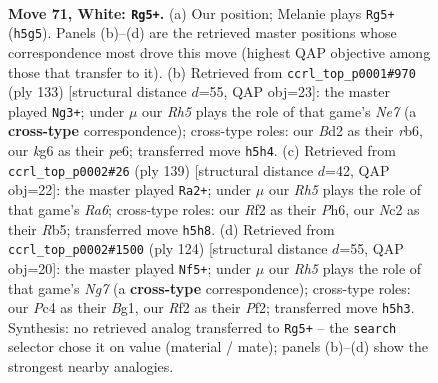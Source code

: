 \documentclass[11pt]{article}
\begin{document}
\clearpage

\begin{figure}[p]\centering
\begin{subfigure}{0.46\textwidth}\centering
\resizebox{\linewidth}{!}{%
\newchessgame
\chessboard[
  setfen={1rr5/pn6/1p2p1k1/4P2R/2P5/K5P1/P1NB1R2/8 w - - 1 71},
  showmover=false,
  pgfstyle=straightmove, color=movearrow, markmove={h5-g5}
]}
\caption{}
\end{subfigure}\hfill
\begin{subfigure}{0.46\textwidth}\centering
\resizebox{\linewidth}{!}{%
\newchessgame
\chessboard[
  setfen={6k1/3r2p1/1R1PPp2/p7/P6p/7P/2r1n3/3R1K2 b - - 8 67},
  showmover=false,
  pgfstyle=straightmove, color=movearrow, markmove={e2-g3}
]}
\caption{}
\end{subfigure}
\\[4pt]
\begin{subfigure}{0.46\textwidth}\centering
\resizebox{\linewidth}{!}{%
\newchessgame
\chessboard[
  setfen={2R5/2R2p1k/5P1p/1r1pp1p1/1P4P1/r6P/3K4/8 b - - 14 70},
  showmover=false,
  pgfstyle=straightmove, color=movearrow, markmove={a3-a2}
]}
\caption{}
\end{subfigure}\hfill
\begin{subfigure}{0.46\textwidth}\centering
\resizebox{\linewidth}{!}{%
\newchessgame
\chessboard[
  setfen={8/1R4N1/2p4k/3n3P/2p3p1/5pP1/5P2/2r3BK w - - 5 63},
  showmover=false,
  pgfstyle=straightmove, color=movearrow, markmove={g7-f5}
]}
\caption{}
\end{subfigure}
\caption{\textbf{Move 71, White: \texttt{Rg5+}.} (a) Our position; Melanie plays \texttt{Rg5+} (\texttt{h5g5}). Panels (b)--(d) are the retrieved master positions whose correspondence most drove this move (highest QAP objective among those that transfer to it). (b) Retrieved from \texttt{ccrl\_top\_p0001\#970} (ply 133) [structural distance $d$=55, QAP obj=23]: the master played \texttt{Ng3+}; under $\mu$ our \emph{Rh5} plays the role of that game's \emph{Ne7} (a \textbf{cross-type} correspondence); cross-type roles: our \emph{B}d2 as their \emph{r}b6, our \emph{k}g6 as their \emph{p}e6; transferred move \texttt{h5h4}. (c) Retrieved from \texttt{ccrl\_top\_p0002\#26} (ply 139) [structural distance $d$=42, QAP obj=22]: the master played \texttt{Ra2+}; under $\mu$ our \emph{Rh5} plays the role of that game's \emph{Ra6}; cross-type roles: our \emph{R}f2 as their \emph{P}h6, our \emph{N}c2 as their \emph{R}b5; transferred move \texttt{h5h8}. (d) Retrieved from \texttt{ccrl\_top\_p0002\#1500} (ply 124) [structural distance $d$=55, QAP obj=20]: the master played \texttt{Nf5+}; under $\mu$ our \emph{Rh5} plays the role of that game's \emph{Ng7} (a \textbf{cross-type} correspondence); cross-type roles: our \emph{P}c4 as their \emph{B}g1, our \emph{R}f2 as their \emph{P}f2; transferred move \texttt{h5h3}. Synthesis: no retrieved analog transferred to \texttt{Rg5+} -- the \texttt{search} selector chose it on value (material / mate); panels (b)--(d) show the strongest nearby analogies.}
\label{fig:thought-m140}
\end{figure}
\end{document}
